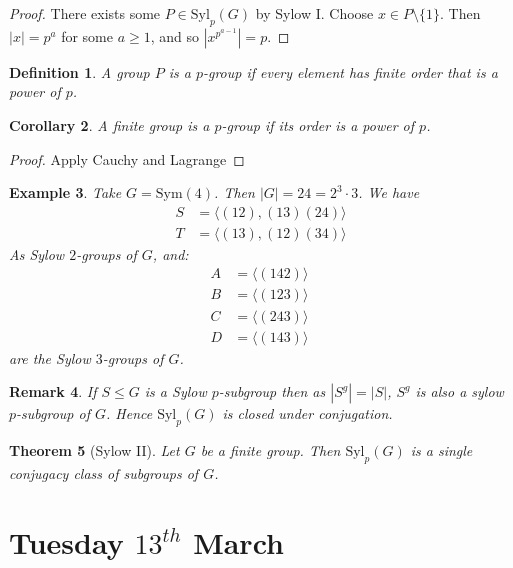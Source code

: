 \documentclass[a4paper,10pt]{article}
\newtheorem{thm}{Theorem}
\newtheorem{Def}[thm]{Definition}
\newtheorem{Cor}[thm]{Corollary}
\newtheorem{eg}[thm]{Example}
\newtheorem{rem}[thm]{Remark}
\begin{document}
\begin{proof}
There exists some $P \in \text{Syl}_p(G)$ by Sylow I. Choose $x \in P \setminus \{ 1 \}$. Then $|x| = p^a$ for some $a \geq 1$, and so $|x^{p^{a-1}}| = p$. 
\end{proof}

\begin{Def}
A group $P$ is a $p$-group if every element has finite order that is a power of $p$.
\end{Def}

\begin{Cor}
A finite group is a $p$-group if its order is a power of $p$. 
\end{Cor}
\begin{proof}
Apply Cauchy and Lagrange
\end{proof}

\begin{eg}
Take $G = \text{Sym}(4)$. Then $|G| = 24 = 2^3 \cdot 3$. We have 
\begin{align*}
S &= \langle (12), (13)(24) \rangle \\
T &= \langle (13), (12)(34) \rangle 
\end{align*}
As Sylow $2$-groups of $G$, and:
\begin{align*}
A &= \langle (142) \rangle \\
B &= \langle (123) \rangle \\
C &= \langle (243) \rangle \\
D &= \langle (143) \rangle\
\end{align*}
are the Sylow $3$-groups of $G$. 
\end{eg}

\begin{rem}
If $S \leq G$ is a Sylow $p$-subgroup then as $|S^g| = |S|$, $S^g$ is also a sylow $p$-subgroup of $G$. Hence $\text{Syl}_p(G)$ is closed under conjugation. 
\end{rem}

\begin{thm}[Sylow II]
Let $G$ be a finite group. Then $\text{Syl}_p(G)$ is a single conjugacy class of subgroups of $G$. 
\end{thm}













\newpage
\section{Tuesday $13^{th}$ March}
\end{document}
